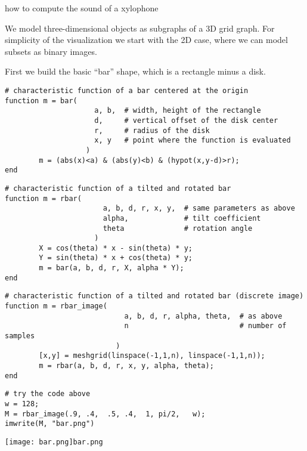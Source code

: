 \documentclass[a4paper,11pt]{article}
\begin{document}
{\Large how to compute the sound of a xylophone}

%

We model three-dimensional objects as subgraphs of a 3D grid graph.
For simplicity of the visualization we start with the 2D case, where we can
model subsets as binary images.


First we build the basic ``bar'' shape, which is a rectangle minus a disk.

\begin{verbatim}
# characteristic function of a bar centered at the origin
function m = bar(
                     a, b,  # width, height of the rectangle
                     d,     # vertical offset of the disk center
                     r,     # radius of the disk
                     x, y   # point where the function is evaluated
                   )
        m = (abs(x)<a) & (abs(y)<b) & (hypot(x,y-d)>r);
end
\end{verbatim}

\begin{verbatim}
# characteristic function of a tilted and rotated bar
function m = rbar(
                       a, b, d, r, x, y,  # same parameters as above
                       alpha,             # tilt coefficient
                       theta              # rotation angle
                     )
        X = cos(theta) * x - sin(theta) * y;
        Y = sin(theta) * x + cos(theta) * y;
        m = bar(a, b, d, r, X, alpha * Y);
end
\end{verbatim}

\begin{verbatim}
# characteristic function of a tilted and rotated bar (discrete image)
function m = rbar_image(
                            a, b, d, r, alpha, theta,  # as above
                            n                          # number of samples
                          )
        [x,y] = meshgrid(linspace(-1,1,n), linspace(-1,1,n));
        m = rbar(a, b, d, r, x, y, alpha, theta);
end
\end{verbatim}

\begin{verbatim}
# try the code above
w = 128;
M = rbar_image(.9, .4,  .5, .4,  1, pi/2,   w);
imwrite(M, "bar.png")
\end{verbatim}

\texttt{[image: bar.png]}\verb+bar.png+
\end{document}
